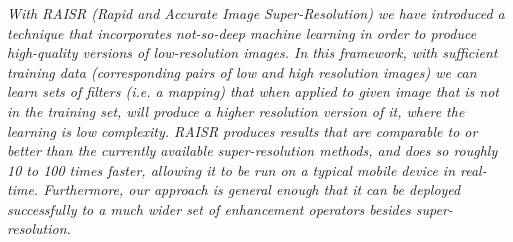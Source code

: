 \begin{multicols}{2}
        \\
        \\\\
        \\
        \\\\
        \\
        \\\\
\\
      \textit{With RAISR (Rapid and Accurate Image Super-Resolution) we have introduced a technique that incorporates not-so-deep machine learning in order to produce high-quality versions of low-resolution images. In this framework, with sufficient training data (corresponding pairs of low and high resolution images) we can learn sets of filters (i.e. a mapping) that when applied to given image that is not in the training set, will produce a higher resolution version of it, where the learning is low complexity. RAISR produces results that are comparable to or better than the currently available super-resolution methods, and does so roughly 10 to 100 times faster, allowing it to be run on a typical mobile device in real-time. Furthermore, our approach is general enough that it can be deployed successfully to a much wider set of enhancement operators besides super-resolution. }\\
\\ 
        \\
        \\\\
        \\
        \\\\
        \\
        \\\\
        \\
        \\\\
        \\
        \\\\
\\

\end{multicols}
